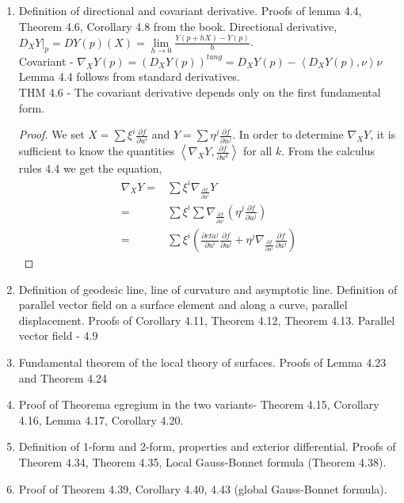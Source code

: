 \documentclass[12pt]{amsart}
\newcommand{\q}[1]{\item #1}
\newcommand{\parti}[2]{\frac{\partial #1}{\partial #2}}
\newcommand{\inn}[1]{\left\langle #1\right\rangle}
\begin{document}
\begin{enumerate}
\newpage
\q{Definition of directional and covariant derivative. Proofs of lemma 4.4, Theorem 4.6, Corollary 4.8 from the book.}
Directional derivative, $D_XY|_p=DY(p)(X)=\lim\limits_{h\to0}\frac{Y(p+hX)-Y(p)}{h}$.
\\Covariant - $\nabla_XY(p)=\left(D_XY(p)\right)^{tang}=D_XY(p)-\inn{D_XY(p),\nu}\nu$
\\Lemma 4.4 follows from standard derivatives.
\\THM 4.6 - The covariant derivative depends only on the first fundamental form.
\begin{proof}
	We set $X=\sum\xi^i\parti{f}{u^i}$ and $Y=\sum\eta^j\parti{f}{u^j}$. In order to determine $\nabla_XY$, it is sufficient to know the quantities $\inn{\nabla_XY,\parti{f}{u^k}}$ for all $k$. From the calculus rules 4.4 we get the equation, 
	\begin{align*}
		\nabla_XY=&\sum\xi^i\nabla_{\parti{f}{u^i}}Y
		\\=&\sum\xi^i\sum\nabla_{\parti{f}{u^i}}\left(\eta^j\parti{f}{u^j}\right)
		\\=&\sum\xi^i\left(\parti{eta^j}{u^i}\parti{f}{u^j}+\eta^j\nabla_{\parti{f}{u^i}}\parti{f}{u^j}\right)
	\end{align*}
\end{proof}

\newpage
\q{Definition of geodesic line, line of curvature and asymptotic line. Definition of parallel vector field on a surface element and along a curve, parallel displacement. Proofs of Corollary 4.11, Theorem 4.12, Theorem 4.13.}
Parallel vector field - 4.9
\\

\newpage
\q{Fundamental theorem of the local theory of surfaces. Proofs of Lemma 4.23 and Theorem 4.24}

\newpage
\q{Proof of Theorema egregium in the two variants- Theorem 4.15, Corollary 4.16, Lemma 4.17, Corollary 4.20.}

\newpage
\q{Definition of 1-form and 2-form, properties and exterior differential. Proofs of Theorem 4.34, Theorem 4.35, Local Gauss-Bonnet formula (Theorem 4.38).}

\newpage
\q{Proof of Theorem 4.39, Corollary 4.40, 4.43 (global Gauss-Bonnet formula).}
\end{enumerate}

\newpage
\end{document}

